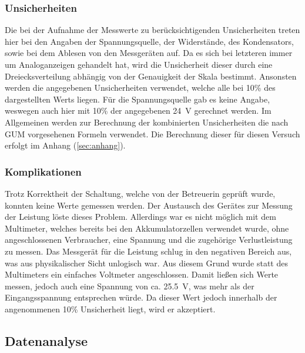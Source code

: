 \subsubsection{Unsicherheiten}

Die bei der Aufnahme der Messwerte zu berücksichtigenden Unsicherheiten treten hier bei den Angaben der Spannungsquelle, der Widerstände, des Kondensators, sowie bei dem Ablesen von den Messgeräten auf. 
Da es sich bei letzteren immer um Analoganzeigen gehandelt hat, wird die Unsicherheit dieser durch eine Dreiecksverteilung abhängig von der Genauigkeit der Skala bestimmt. 
Ansonsten werden die angegebenen Unsicherheiten verwendet, welche alle bei 10\% des dargestellten Werts liegen. Für die Spannungsquelle gab es keine Angabe, weswegen auch hier mit 10\% der angegebenen \SI{24}{\V} gerechnet werden.
Im Allgemeinen werden zur Berechnung der kombinierten Unsicherheiten die nach GUM vorgesehenen Formeln verwendet. 
Die Berechnung dieser für diesen Versuch erfolgt im Anhang (\ref*{sec:anhang}).

\subsubsection{Komplikationen}

Trotz Korrektheit der Schaltung, welche von der Betreuerin geprüft wurde, konnten keine Werte gemessen werden. 
Der Austausch des Gerätes zur Messung der Leistung löste dieses Problem.
Allerdings war es nicht möglich mit dem Multimeter, welches bereits bei den Akkumulatorzellen verwendet wurde, ohne angeschlossenen Verbraucher, eine Spannung und die zugehörige Verlustleistung zu messen.
Das Messgerät für die Leistung schlug in den negativen Bereich aus, was aus physikalischer Sicht unlogisch war.
Aus diesem Grund wurde statt des Multimeters ein einfaches Voltmeter angeschlossen.
Damit ließen sich Werte messen, jedoch auch eine Spannung von ca. \SI{25,5}{\V}, was mehr als der Eingangsspannung entsprechen würde. Da dieser Wert jedoch innerhalb der angenommenen 10\% Unsicherheit liegt, wird er akzeptiert.

\subsection{Datenanalyse}

